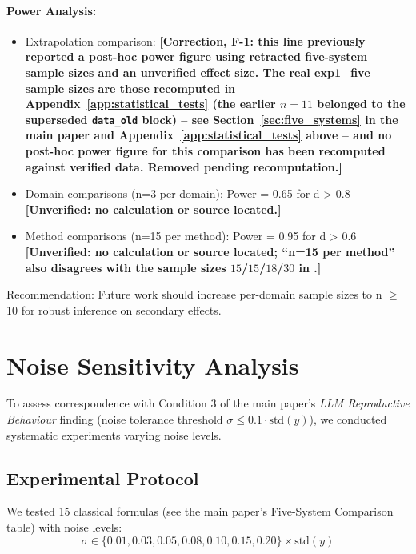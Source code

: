 \documentclass[twoside,11pt]{article}
\begin{document}
\paragraph{Power Analysis:}
\begin{itemize}
\item Extrapolation comparison: \textbf{[Correction, F-1: this line previously reported a post-hoc power figure using retracted five-system sample sizes and an unverified effect size. The real exp1\_five sample sizes are those recomputed in Appendix~\ref{app:statistical_tests} (the earlier $n=11$ belonged to the superseded \texttt{data\_old} block) -- see Section~\ref{sec:five_systems} in the main paper and Appendix~\ref{app:statistical_tests} above -- and no post-hoc power figure for this comparison has been recomputed against verified data. Removed pending recomputation.]}
\item Domain comparisons (n=3 per domain): Power = 0.65 for d > 0.8 \textbf{[Unverified: no calculation or source located.]}
\item Method comparisons (n=15 per method): Power = 0.95 for d > 0.6 \textbf{[Unverified: no calculation or source located; ``n=15 per method'' also disagrees with the sample sizes $15$/$15$/$18$/$30$ in .]}
\end{itemize}

Recommendation: Future work should increase per-domain sample sizes to n $\geq$ 10 for robust inference on secondary effects.



\section{Noise Sensitivity Analysis}
\label{app:noise_sensitivity}

To assess correspondence with Condition 3 of the main paper's \emph{LLM Reproductive Behaviour} finding (noise tolerance threshold $\sigma \leq 0.1 \cdot \text{std}(y)$), we conducted systematic experiments varying noise levels.

\subsection{Experimental Protocol}

We tested 15 classical formulas (see the main paper's Five-System Comparison table) with noise levels:
\[
\sigma \in \{0.01, 0.03, 0.05, 0.08, 0.10, 0.15, 0.20\} \times \text{std}(y)
\]
\end{document}
